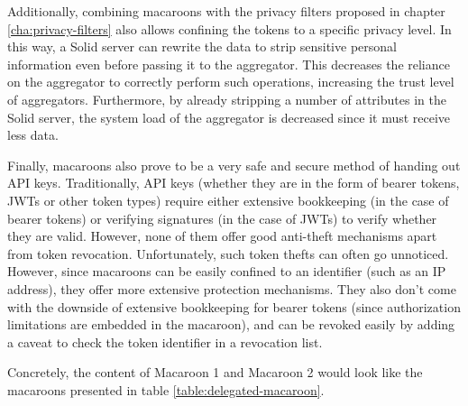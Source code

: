 Additionally, combining macaroons with the privacy filters proposed in chapter \ref{cha:privacy-filters} also allows confining the tokens to a specific privacy level. In this way, a Solid server can rewrite the data to strip sensitive personal information even before passing it to the aggregator. This decreases the reliance on the aggregator to correctly perform such operations, increasing the trust level of aggregators. Furthermore, by already stripping a number of attributes in the Solid server, the system load of the aggregator is decreased since it must receive less data.

Finally, macaroons also prove to be a very safe and secure method of handing out API keys. Traditionally, API keys (whether they are in the form of bearer tokens, \gls{JWT}s or other token types) require either extensive bookkeeping (in the case of bearer tokens) or verifying signatures (in the case of \gls{JWT}s) to verify whether they are valid. However, none of them offer good anti-theft mechanisms apart from token revocation. Unfortunately, such token thefts can often go unnoticed. However, since macaroons can be easily confined to an identifier (such as an IP address), they offer more extensive protection mechanisms. They also don't come with the downside of extensive bookkeeping for bearer tokens (since authorization limitations are embedded in the macaroon), and can be revoked easily by adding a caveat to check the token identifier in a revocation list.

Concretely, the content of Macaroon 1 and Macaroon 2 would look like the macaroons presented in table \ref{table:delegated-macaroon}.


